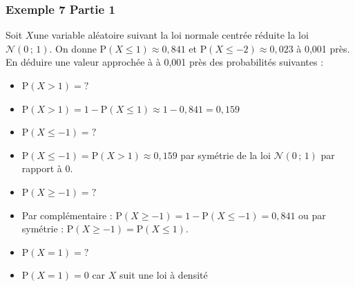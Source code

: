 \documentclass[xcolor=svgnames,t,final]{beamer}
\begin{document}
\begin{frame}
\frametitle{Exemple 7 Partie 1}
\label{exemple7}

Soit  $X $une variable aléatoire suivant la loi normale centrée réduite la loi $\mathcal{N}\left(0 \, ; \, 1\right)$. On donne $\text{P}\left( X \leqslant 1 \right) \approx 0,841$  et  $\text{P}\left( X \leqslant -2 \right) \approx 0,023$ à 0,001 près. En déduire une valeur approchée à à 0,001 près des probabilités suivantes :

\begin{itemize}
\item $\text{P}\left( X > 1 \right) = ?$
\pause \item $\text{P}\left( X > 1 \right) = 1 -\text{P}\left( X \leqslant 1 \right)\approx 1 - 0,841 = 0,159$
\item $\text{P}\left( X \leqslant -1 \right)=?$
\pause \item $\text{P}\left( X \leqslant -1 \right)=\text{P}\left( X > 1 \right)\approx 0,159$ par symétrie de la loi $\mathcal{N}\left(0 \, ; \, 1\right)$ par rapport à 0. 
\item $\text{P}\left( X \geqslant -1 \right)=?$
\pause \item Par complémentaire :  $\text{P}\left( X \geqslant -1 \right)=1-\text{P}\left( X \leqslant -1 \right)=0,841$ ou par symétrie : $\text{P}\left( X \geqslant -1 \right)=\text{P}\left( X \leqslant 1 \right)$.
\item $\text{P}\left( X = 1 \right)=?$
\pause \item  $\text{P}\left( X = 1 \right)=0$ car $X$ suit une loi à densité

\end{itemize}


\end{frame}
\end{document}
